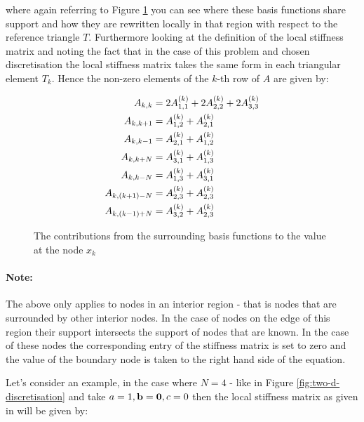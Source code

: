 where again referring to Figure \ref{fig:twod-global-basis-contrib} you can see
where these basis functions share support and how they are rewritten locally in
that region with respect to the reference triangle $T$. Furthermore looking at
the definition of the local stiffness matrix 
and noting the fact that in the case of this problem and chosen discretisation
the local stiffness matrix takes the same form in each triangular element
$T_k$. Hence the non-zero elements of the $k$-th row of $A$ are given by:

\begin{align}
  \begin{split}
    A_{k,k} &= 2A^{(k)}_{1,1} + 2A^{(k)}_{2,2} + 2A^{(k)}_{3,3} \\
    A_{k,k+1} &= A^{(k)}_{1,2} + A^{(k)}_{2,1} \\
    A_{k,k-1} &= A^{(k)}_{2,1} + A^{(k)}_{1,2} \\
    A_{k,k+N} &= A^{(k)}_{3,1} + A^{(k)}_{1,3} \\
    A_{k,k-N} &= A^{(k)}_{1,3} + A^{(k)}_{3,1} \\
    A_{k,(k+1)-N} &= A^{(k)}_{2,3} + A^{(k)}_{2,3} \\
    A_{k,(k-1)+N} &= A^{(k)}_{3,2} + A^{(k)}_{2,3}
  \end{split}
\end{align}

\begin{figure}
    \centering
    
    \caption{The contributions from the surrounding basis functions to the
        value at the node $x_k$}
    \label{fig:twod-global-basis-contrib}
\end{figure}

\paragraph{Note:}

The above only applies to nodes in an interior region - that
is nodes that are surrounded by other interior nodes. In the case of nodes on
the edge of this region their support intersects the support of nodes that are
known. In the case of these nodes the corresponding entry of the stiffness
matrix is set to zero and the value of the boundary node is taken to the right
hand side of the equation.

Let's consider an example, in the case where $N = 4$ - like in Figure
\ref{fig:two-d-discretisation} and take $a = 1, \mathbf{b} = \mathbf{0}, c = 0$
then the local stiffness matrix as given in
 will be given by:

